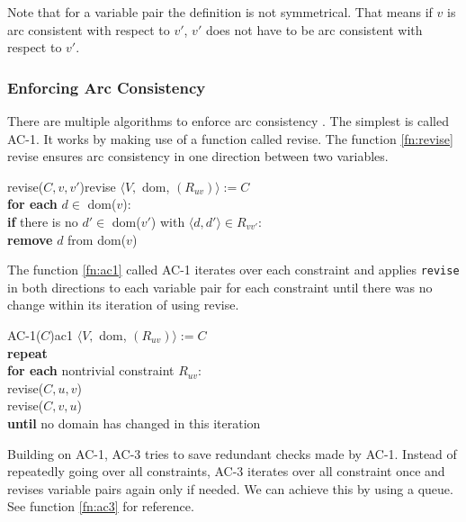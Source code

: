 Note that for a variable pair the definition is not symmetrical. That means if $v$ is arc consistent with respect to $v'$, $v'$ does not have to be arc consistent with respect to $v'$.

\subsubsection{Enforcing Arc Consistency}

There are multiple algorithms to enforce arc consistency \cite{arc_studied:1977} \cite{arc_again:1994}. The simplest is called AC-1. It works by making use of a function called revise. The function \ref{fn:revise} revise ensures arc consistency in one direction between two variables. \\

\begin{function}{revise($C,v,v'$)}{revise}
	$\langle V,$ dom, $(R_{uv})\rangle := C$ \\
	\textbf{for each} $d \in$ dom($v$): \\
	\null \qquad \textbf{if} there is no $d' \in$ dom($v'$) with $\langle d, d' \rangle \in R_{vv'}$: \\
	\null \qquad \qquad \textbf{remove} $d$ from dom($v$)
\end{function}

The function \ref{fn:ac1} called AC-1 iterates over each constraint and applies \verb|revise| in both directions to each variable pair for each constraint until there was no change within its iteration of using revise. \\

\begin{function}{AC-1($C$)}{ac1}
	$\langle V,$ dom, $(R_{uv})\rangle := C$ \\
	\textbf{repeat} \\
	\null \qquad \textbf{for each} nontrivial constraint $R_{uv}$: \\
	\null \qquad \qquad revise($C, u, v$) \\
	\null \qquad \qquad revise($C, v, u$) \\
	\textbf{until} no domain has changed in this iteration
\end{function}

Building on AC-1, AC-3 tries to save redundant checks made by AC-1. Instead of repeatedly going over all constraints, AC-3 iterates over all constraint once and revises variable pairs again only if needed. We can achieve this by using a queue. See function \ref{fn:ac3} for reference. \\

